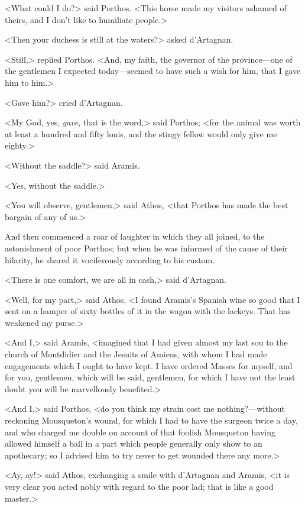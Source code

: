 <What could I do?> said Porthos. <This horse made my visitors ashamed of theirs, and I don't like to humiliate people.> 

<Then your duchess is still at the waters?> asked d'Artagnan. 

<Still,> replied Porthos. <And, my faith, the governor of the province---one of the gentlemen I expected today---seemed to have such a wish for him, that I gave him to him.> 

<Gave him?> cried d'Artagnan. 

<My God, yes, \textit{gave}, that is the word,> said Porthos; <for the animal was worth at least a hundred and fifty louis, and the stingy fellow would only give me eighty.> 

<Without the saddle?> said Aramis. 

<Yes, without the saddle.> 

<You will observe, gentlemen,> said Athos, <that Porthos has made the best bargain of any of us.> 

And then commenced a roar of laughter in which they all joined, to the astonishment of poor Porthos; but when he was informed of the cause of their hilarity, he shared it vociferously according to his custom. 

<There is one comfort, we are all in cash,> said d'Artagnan. 

<Well, for my part,> said Athos, <I found Aramis's Spanish wine so good that I sent on a hamper of sixty bottles of it in the wagon with the lackeys. That has weakened my purse.> 

<And I,> said Aramis, <imagined that I had given almost my last sou to the church of Montdidier and the Jesuits of Amiens, with whom I had made engagements which I ought to have kept. I have ordered Masses for myself, and for you, gentlemen, which will be said, gentlemen, for which I have not the least doubt you will be marvellously benefited.> 

<And I,> said Porthos, <do you think my strain cost me nothing?---without reckoning Mousqueton's wound, for which I had to have the surgeon twice a day, and who charged me double on account of that foolish Mousqueton having allowed himself a ball in a part which people generally only show to an apothecary; so I advised him to try never to get wounded there any more.> 

<Ay, ay!> said Athos, exchanging a smile with d'Artagnan and Aramis, <it is very clear you acted nobly with regard to the poor lad; that is like a good master.> 

